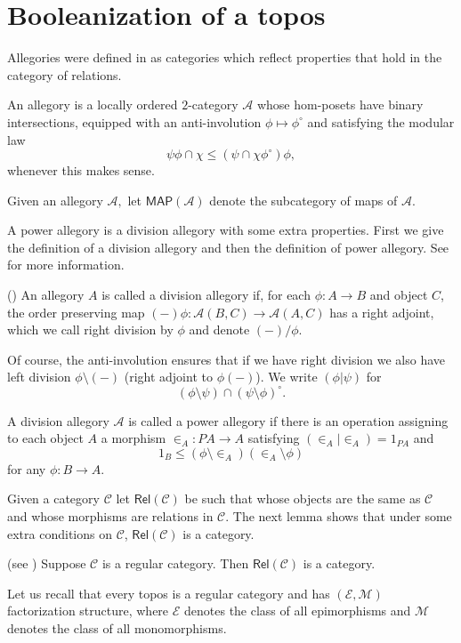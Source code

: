 \documentclass{tac}
\theoremstyle{definition}
\theoremstyle{remark}
\def\mc#1{\mathcal {#1}}
\def\C{\mc C}
\def\A{\mc A}
\def\E{\mc E}
\def\M{\mc M}
\begin{document}
\section{Booleanization of a topos}
Allegories were defined in \cite{freyd} as categories which reflect properties that hold in the category  of relations.
\begin{definition}
	An allegory is a locally ordered $2$-category $\A$ whose hom-posets
	have binary intersections, equipped with an anti-involution $\phi \mapsto \phi^{\circ}$ and satisfying the modular law
	\[
	\psi\phi \cap \chi \leq (\psi \cap \chi\phi^{\circ})\phi,
	\]
	whenever this makes sense.
\end{definition}
\begin{definition}
	Given an allegory $\A,$ let $\mathsf{MAP}(\A)$ denote the subcategory of maps of $\A.$
\end{definition}

A power allegory is a division allegory with some extra properties. First we give the definition of a division allegory and then the definition of power allegory. See \cite{john} for more information.
\begin{definition}(\cite[Definition 3.4.1]{john})
	An allegory $A$ is called a division allegory if, for each $\phi:A\rightarrow B$ and object $C$, the order preserving map $(-)\phi:\A(B,C)\longrightarrow \A(A,C)$ has a right adjoint, which we call right division by $\phi$ and denote $(-)/\phi$.
\end{definition}
Of course, the anti-involution ensures that if we have right division we also have left division $\phi\setminus (-)$ (right adjoint to $\phi(-)$).
We write $(\phi|\psi)$ for
$$(\phi\setminus \psi)\cap (\psi\setminus \phi)^\circ.$$
\begin{definition}\cite{john}
	A division allegory $\A$ is called a power allegory if there is an operation assigning to each object $A$ a morphism $\in_A:PA\rightarrow A$ satisfying $(\in_A|\in_A)=1_{PA}$ and
	$$1_B\le (\phi\setminus\in_A)(\in_A\setminus\phi)$$
	for any $\phi:B\rightarrow A$.
\end{definition}
Given a category $\C$ let $\mathsf{Rel(\C)}$ be such that whose objects are
the same as $\C$ and whose morphisms are relations in $\C.$ The next lemma shows that under some extra conditions on
$\C$, $\mathsf{Rel(\C)}$  is a category.
\begin{lemma} (see \cite[Corollary 3.1.2]{john})
	Suppose $\C$ is a regular category. Then $\mathsf{Rel(\C)}$ is a category.
\end{lemma}
Let us recall that every topos is a regular category and has $(\E,\M)$ factorization structure, where
  $\E$ denotes the class of all epimorphisms and $\M$ denotes the class of all monomorphisms.
\end{document}
